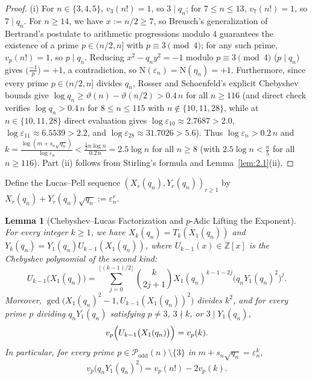 \documentclass[11pt,reqno]{amsart}
\newtheorem{lemma}[theorem]{Lemma}
\theoremstyle{remark}
\numberwithin{equation}{section}
\newcommand{\Z}{\mathbb{Z}}
\newcommand{\Podd}{\mathcal{P}_{\mathrm{odd}}}
\begin{document}
\begin{proof}
(i) For $n \in \{3, 4, 5\}$, $v_3(n!) = 1$, so $3 \mid q_n$; for $7 \le n \le 13$, $v_7(n!) = 1$, so $7 \mid q_n$. For $n \ge 14$, we have $x := n/2 \ge 7$, so Breusch's generalization of Bertrand's postulate to arithmetic progressions modulo 4 \cite{Breusch1932} guarantees the existence of a prime $p \in (n/2, n]$ with $p \equiv 3 \pmod 4$; for any such prime, $v_p(n!) = 1$, so $p \mid q_n$. Reducing $x^2 - q_n y^2 = -1$ modulo $p \equiv 3 \pmod 4$ ($p \mid q_n$) gives $\bigl(\frac{-1}{p}\bigr) = +1$, a contradiction, so $\mathrm{N}(\varepsilon_n) = \mathrm{N}(\eta_n) = +1$. Furthermore, since every prime $p \in (n/2, n]$ divides $q_n$, Rosser and Schoenfeld's explicit Chebyshev bounds \cite[Theorem~10]{RosserSchoenfeld1962} give $\log q_n \ge \vartheta(n) - \vartheta(n/2) > 0.4\,n$ for all $n \ge 116$ (and direct check verifies $\log q_n > 0.4\,n$ for $8 \le n \le 115$ with $n \notin \{10, 11, 28\}$, while at $n \in \{10, 11, 28\}$ direct evaluation gives $\log \varepsilon_{10} \approx 2.7687 > 2.0$, $\log \varepsilon_{11} \approx 6.5539 > 2.2$, and $\log \varepsilon_{28} \approx 31.7026 > 5.6$). Thus $\log \varepsilon_n > 0.2\,n$ and $k = \frac{\log(m + s_n\sqrt{q_n})}{\log \varepsilon_n} < \frac{\frac{1}{2}n\log n}{0.2\,n} = 2.5\log n$ for all $n \ge 8$ (with $2.5\log n < \frac{n}{5}$ for all $n \ge 116$). Part (ii) follows from Stirling's formula and Lemma~\ref{lem:2.1}(ii).
\end{proof}

Define the Lucas--Pell sequence $(X_r(q_n), Y_r(q_n))_{r \ge 1}$ by $X_r(q_n) + Y_r(q_n)\sqrt{q_n} := \varepsilon_n^r$.

\begin{lemma}[{Chebyshev--Lucas Factorization and $p$-Adic Lifting the Exponent}]\label{lem:3.2}
For every integer $k \ge 1$, we have $X_k(q_n) = T_k(X_1(q_n))$ and $Y_k(q_n) = Y_1(q_n)U_{k-1}(X_1(q_n))$, where $U_{k-1}(x) \in \Z[x]$ is the Chebyshev polynomial of the second kind:
\begin{equation}\label{eq:3.1}
U_{k-1}\bigl(X_1(q_n)\bigr) = \sum_{j=0}^{\lfloor (k-1)/2 \rfloor} \binom{k}{2j + 1} X_1(q_n)^{k-1-2j}\bigl(q_n Y_1(q_n)^2\bigr)^j.
\end{equation}
Moreover, $\gcd\bigl(X_1(q_n)^2 - 1, U_{k-1}(X_1(q_n))^2\bigr)$ divides $k^2$, and for every prime $p$ dividing $q_n Y_1(q_n)$ satisfying $p \ne 3$, $3 \nmid k$, or $3 \mid Y_1(q_n)$,
\begin{equation}\label{eq:3.2}
v_p\Bigl(U_{k-1}\bigl(X_1(q_n)\bigr)\Bigr) = v_p(k).
\end{equation}
In particular, for every prime $p \in \Podd(n) \setminus \{3\}$ in $m + s_n\sqrt{q_n} = \varepsilon_n^k$,
\begin{equation}\label{eq:3.3}
v_p\bigl(q_n Y_1(q_n)^2\bigr) = v_p(n!) - 2v_p(k).
\end{equation}
\end{lemma}
\end{document}
